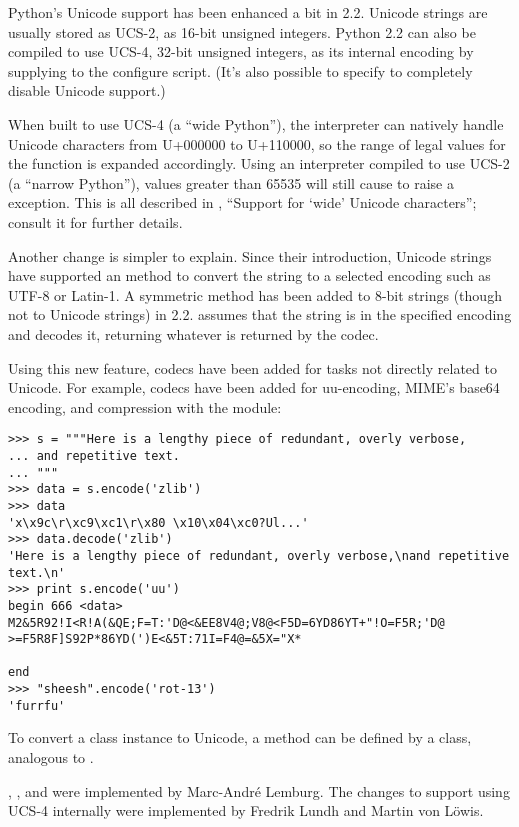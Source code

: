 \documentclass{howto}
\begin{document}
Python's Unicode support has been enhanced a bit in 2.2.  Unicode
strings are usually stored as UCS-2, as 16-bit unsigned integers.
Python 2.2 can also be compiled to use UCS-4, 32-bit unsigned
integers, as its internal encoding by supplying
 to the configure script.  
(It's also possible to specify
 to completely disable Unicode
support.)

When built to use UCS-4 (a ``wide Python''), the interpreter can
natively handle Unicode characters from U+000000 to U+110000, so the
range of legal values for the  function is expanded
accordingly.  Using an interpreter compiled to use UCS-2 (a ``narrow
Python''), values greater than 65535 will still cause
 to raise a  exception.
This is all described in , ``Support for `wide' Unicode
characters''; consult it for further details.

Another change is simpler to explain. Since their introduction,
Unicode strings have supported an  method to convert
the string to a selected encoding such as UTF-8 or Latin-1.  A
symmetric  method has been
added to 8-bit strings (though not to Unicode strings) in 2.2.
 assumes that the string is in the specified encoding
and decodes it, returning whatever is returned by the codec. 

Using this new feature, codecs have been added for tasks not directly
related to Unicode.  For example, codecs have been added for
uu-encoding, MIME's base64 encoding, and compression with the
 module:

\begin{verbatim}
>>> s = """Here is a lengthy piece of redundant, overly verbose,
... and repetitive text.
... """
>>> data = s.encode('zlib')
>>> data
'x\x9c\r\xc9\xc1\r\x80 \x10\x04\xc0?Ul...'
>>> data.decode('zlib')
'Here is a lengthy piece of redundant, overly verbose,\nand repetitive text.\n'
>>> print s.encode('uu')
begin 666 <data>
M2&5R92!I<R!A(&QE;F=T:'D@<&EE8V4@;V8@<F5D=6YD86YT+"!O=F5R;'D@
>=F5R8F]S92P*86YD(')E<&5T:71I=F4@=&5X="X*

end
>>> "sheesh".encode('rot-13')
'furrfu'
\end{verbatim}

To convert a class instance to Unicode, a  method
can be defined by a class, analogous to .

, , and  were
implemented by Marc-Andr\'e Lemburg.  The changes to support using
UCS-4 internally were implemented by Fredrik Lundh and Martin von
L\"owis.
\end{document}
